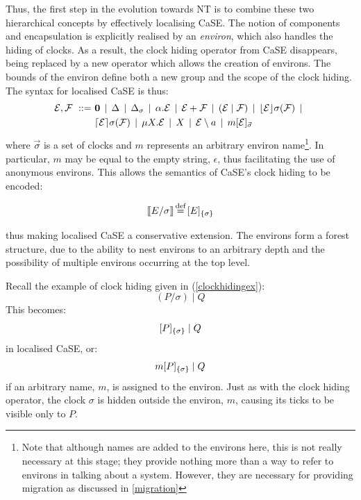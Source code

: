 Thus, the first step in the evolution towards NT is to combine these
two hierarchical concepts by effectively localising CaSE.  The notion of
components and encapsulation is explicitly realised by an
\emph{environ}, which also handles the hiding of clocks.  As a result,
the clock hiding operator from CaSE disappears, being replaced by a new
operator which allows the creation of environs.  The bounds of the
environ define both a new group and the scope of the clock hiding.  The
syntax for localised CaSE is thus:
\begin{equation}
  \begin{aligned}
    \text{$\mathcal{E}$}, \text{$\mathcal{F}$}\ ::=\ &
    \textbf{0}  \;\,|\,\; 
    \Delta \;\,|\,\; 
    \Delta_{\sigma} \;\,|\,\; 
    \alpha . \text{$\mathcal{E}$}  \;\,|\,\;
    \text{$\mathcal{E}$} + \text{$\mathcal{F}$} \;\,|\,\; 
    (\text{$\mathcal{E}$}\;|\;\text{$\mathcal{F}$})\;\,|\,\; 
    \lfloor{\text{$\mathcal{E}$}}\rfloor {\sigma} ({\text{$\mathcal{F}$}}) \;\,|\,\; \\
    & \lceil{\text{$\mathcal{E}$}}\rceil {\sigma} ({\text{$\mathcal{F}$}}) \;\,|\,\; 
    \mu X . \text{$\mathcal{E}$} \;\,|\,\; 
    X \;\,|\,\; 
    \text{$\mathcal{E}$} \setminus a \;\,|\,\; 
    {m}[ \text{$\mathcal{E}$} ]_{\vec{\sigma}}
  \end{aligned}
\end{equation}
where $\vec{\sigma}$ is a set of clocks and $m$ represents an
arbitrary environ name\footnote{Note that although names are added to
  the environs here, this is not really necessary at this stage; they
  provide nothing more than a way to refer to environs in talking
  about a system.  However, they are necessary for providing migration
  as discussed in \ref{migration}}.  In particular, $m$ may be equal
to the empty string, $\epsilon$, thus facilitating the use of
anonymous environs.  This allows the semantics of CaSE's clock hiding
to be encoded:

\begin{equation}
[\hspace{-0.3ex}[ E / \sigma ]\hspace{-0.3ex}] \operatorname{\stackrel{\textrm{def}}{=}} {}[ E ]_{\{\sigma\}}
\end{equation}

\noindent thus making localised CaSE a conservative extension.  The
environs form a forest structure, due to the ability to nest
environs to an arbitrary depth and the possibility of multiple
environs occurring at the top level.

Recall the example of clock hiding given in (\ref{clockhidingex}):
\begin{equation}
  (P / \sigma)\;|\;Q
\end{equation}
This becomes:
\begin{equation}
  {}[ P ]_{\{\sigma\}}\;|\;Q
\end{equation}
in localised CaSE, or:
\begin{equation}
  {m}[ P ]_{\{\sigma\}}\;|\;Q
\end{equation}
if an arbitrary name, $m$, is assigned to the environ.  Just
as with the clock hiding operator, the clock $\sigma$ is hidden outside
the environ, $m$, causing its ticks to be visible only to $P$.  

